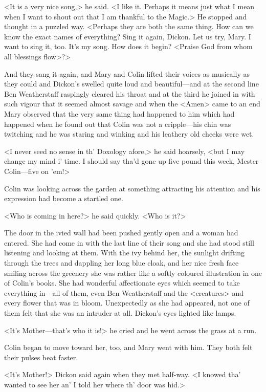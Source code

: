<It is a very nice song,> he said. <I like it. Perhaps it means just what I mean when I want to shout out that I am thankful to the Magic.> He stopped and thought in a puzzled way. <Perhaps they are both the same thing. How can we know the exact names of everything? Sing it again, Dickon. Let us try, Mary. I want to sing it, too. It's my song. How does it begin? <Praise God from whom all blessings flow>?>

And they sang it again, and Mary and Colin lifted their voices as musically as they could and Dickon's swelled quite loud and beautiful—and at the second line Ben Weatherstaff raspingly cleared his throat and at the third he joined in with such vigour that it seemed almost savage and when the <Amen> came to an end Mary observed that the very same thing had happened to him which had happened when he found out that Colin was not a cripple—his chin was twitching and he was staring and winking and his leathery old cheeks were wet.

<I never seed no sense in th' Doxology afore,> he said hoarsely, <but I may change my mind i' time. I should say tha'd gone up five pound this week, Mester Colin—five on 'em!>

Colin was looking across the garden at something attracting his attention and his expression had become a startled one.

<Who is coming in here?> he said quickly. <Who is it?>

The door in the ivied wall had been pushed gently open and a woman had entered. She had come in with the last line of their song and she had stood still listening and looking at them. With the ivy behind her, the sunlight drifting through the trees and dappling her long blue cloak, and her nice fresh face smiling across the greenery she was rather like a softly coloured illustration in one of Colin's books. She had wonderful affectionate eyes which seemed to take everything in—all of them, even Ben Weatherstaff and the <creatures> and every flower that was in bloom. Unexpectedly as she had appeared, not one of them felt that she was an intruder at all. Dickon's eyes lighted like lamps.

<It's Mother—that's who it is!> he cried and he went across the grass at a run.

Colin began to move toward her, too, and Mary went with him. They both felt their pulses beat faster.

<It's Mother!> Dickon said again when they met half-way. <I knowed tha' wanted to see her an' I told her where th' door was hid.>

